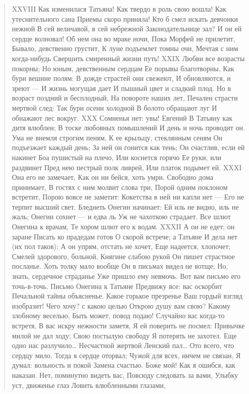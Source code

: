 \begin{verse}
XXVIII
Как изменилася Татьяна!
Как твердо в роль свою вошла!
Как утеснительного сана
Приемы скоро приняла!
Кто б смел искать девчонки нежной
В сей величавой, в сей небрежной
Законодательнице зал?
И он ей сердце волновал!
Об нем она во мраке ночи,
Пока Морфей не прилетит,
Бывало, девственно грустит,
К луне подъемлет томны очи,
Мечтая с ним когда-нибудь
Свершить смиренный жизни путь!
XXIX
Любви все возрасты покорны;
Но юным, девственным сердцам
Ее порывы благотворны,
Как бури вешние полям:
В дожде страстей они свежеют,
И обновляются, и зреют —
И жизнь могущая дает
И пышный цвет и сладкий плод.
Но в возраст поздний и бесплодный,
На повороте наших лет,
Печален страсти мертвой след:
Так бури осени холодной
В болото обращают луг
И обнажают лес вокруг.
XXX
Сомненья нет: увы! Евгений
В Татьяну как дитя влюблен;
В тоске любовных помышлений
И день и ночь проводит он.
Ума не внемля строгим пеням,
К ее крыльцу, стеклянным сеням
Он подъезжает каждый день;
За ней он гонится как тень;
Он счастлив, если ей накинет
Боа пушистый на плечо,
Или коснется горячо
Ее руки, или раздвинет
Пред нею пестрый полк ливрей,
Или платок подымет ей.
XXXI
Она его не замечает,
Как он ни бейся, хоть умри.
Свободно дома принимает,
В гостях с ним молвит слова три,
Порой одним поклоном встретит,
Порою вовсе не заметит:
Кокетства в ней ни капли нет —
Его не терпит высший свет.
Бледнеть Онегин начинает:
Ей иль не видно, иль не жаль;
Онегин сохнет — и едва ль
Уж не чахоткою страдает.
Все шлют Онегина к врачам,
Те хором шлют его к водам.
XXXII
А он не едет; он заране
Писать ко прадедам готов
О скорой встрече; а Татьяне
И дела нет (их пол таков);
А он упрям, отстать не хочет,
Еще надеется, хлопочет;
Смелей здорового, больной,
Княгине слабою рукой
Он пишет страстное посланье.
Хоть толку мало вообще
Он в письмах видел не вотще;
Но, знать, сердечное страданье
Уже пришло ему невмочь.
Вот вам письмо его точь-в-точь.
Письмо Онегина к Татьяне
Предвижу все: вас оскорбит
Печальной тайны объясненье.
Какое горькое презренье
Ваш гордый взгляд изобразит!
Чего хочу? с какою целью
Открою душу вам свою?
Какому злобному веселью,
Быть может, повод подаю!
Случайно вас когда-то встретя,
В вас искру нежности заметя,
Я ей поверить не посмел:
Привычке милой не дал ходу;
Свою постылую свободу
Я потерять не захотел.
Еще одно нас разлучило…
Несчастной жертвой Ленский пал…
Ото всего, что сердцу мило,
Тогда я сердце оторвал;
Чужой для всех, ничем не связан,
Я думал: вольность и покой
Замена счастью. Боже мой!
Как я ошибся, как наказан.
Нет, поминутно видеть вас,
Повсюду следовать за вами,
Улыбку уст, движенье глаз
Ловить влюбленными глазами,

\end{verse}
